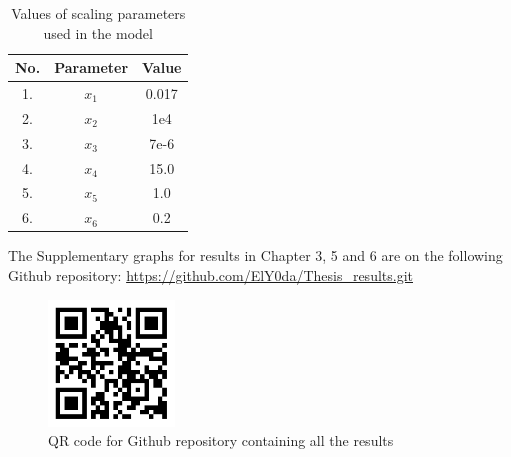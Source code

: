\begin{table}[p]
  \centering
  \begin{tabular}{|c|c|c|}
    \hline
    \textbf{No.} & \textbf{Parameter} & \textbf{Value} \\
    \hline
    1. & $x_{1}$ & 0.017 \\
    \hline
    2. & $x_{2}$ & 1e4 \\
    \hline
    3. & $x_{3}$ & 7e-6 \\
    \hline
    4. & $x_{4}$ & 15.0 \\
    \hline
    5. & $x_{5}$ & 1.0 \\
    \hline
    6. & $x_{6}$ & 0.2 \\
    \hline
  \end{tabular}
  \caption{Values of scaling parameters used in the model}
  \label{tab:scale_param}
\end{table}
\clearpage
\noindent The Supplementary graphs for results in Chapter 3, 5 and 6 are on the following Github repository: \url{https://github.com/ElY0da/Thesis_results.git}
\begin{figure}[h]
  \centering
  \includegraphics[width=0.3\textwidth]{CA2/github_thesis_results}
  \caption{QR code for Github repository containing all the results}
\end{figure}
\clearpage
